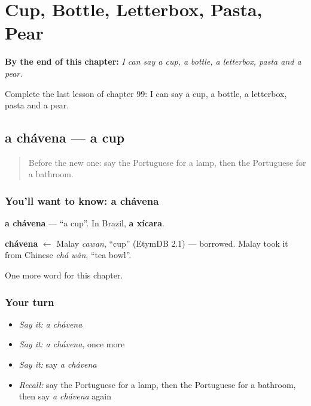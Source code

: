 
\chapter{Cup, Bottle, Letterbox, Pasta, Pear}
\label{ch:pt-cup-bottle-letterbox-pasta-pear}

\begin{chapteropening}
\textbf{By the end of this chapter:} \emph{I can say a cup, a bottle, a letterbox, pasta and a pear.}

Complete the last lesson of chapter 99: I can say a cup, a bottle, a letterbox, pasta and a pear.
\end{chapteropening}

\section[a chávena]{a chávena — a cup}

\label{lesson:PT-C99-chavena}



\begin{quote}
Before the new one: say the Portuguese for a lamp, then the Portuguese for a bathroom.
\end{quote}

\subsection*{You'll want to know: a chávena}
\textbf{a chávena} — \textquotedblleft{}a cup\textquotedblright{}. In Brazil, \textbf{a xícara}.

\begin{cousinweb}
\textbf{chávena} $\leftarrow$ Malay \emph{cawan}, \textquotedblleft{}cup\textquotedblright{} (EtymDB 2.1) — borrowed. Malay took it from Chinese \emph{chá wǎn}, \textquotedblleft{}tea bowl\textquotedblright{}.
\end{cousinweb}

\begin{grammarlens}[title={What you've built}]
One more word for this chapter.
\end{grammarlens}

\subsection*{Your turn}
\begin{itemize}
\raggedright
  \item \emph{Say it:} \emph{a chávena}
  \item \emph{Say it:} \emph{a chávena}, once more
  \item \emph{Say it:} say \emph{a chávena}
  \item \emph{Recall:} say the Portuguese for a lamp, then the Portuguese for a bathroom, then say \emph{a chávena} again
\end{itemize}

